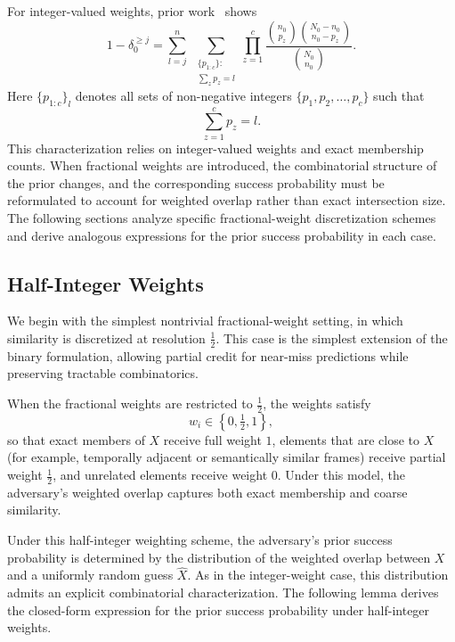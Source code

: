 \documentclass[letterpaper]{article} %
\begin{document}
For integer-valued weights, prior work~\cite{xiao2024formal} shows
\begin{equation}
    1 - \delta_{0}^{\ge j}
=
\sum_{l=j}^{n}\;
\sum_{\substack{\{p_{1:c}\}:\\ \sum_z p_z = l}}
\prod_{z=1}^c
\frac{\binom{n_0}{p_z}
\binom{N_0 - n_0}{n_0 - p_z}}
{\binom{N_0}{n_0}}.
\end{equation}
Here $\{p_{1:c}\}_l$ denotes all sets of non-negative integers $\{p_1, p_2, \ldots, p_c\}$ such that
\[
\sum_{z=1}^c p_z = l.
\]
This characterization relies on integer-valued weights and exact membership counts. When fractional weights are introduced, the combinatorial structure of the prior changes, and the corresponding success probability must be reformulated to account for weighted overlap rather than exact intersection size. The following sections analyze specific fractional-weight discretization schemes and derive analogous expressions for the prior success probability in each case.


\subsection{Half-Integer Weights}

We begin with the simplest nontrivial fractional-weight setting, in which similarity is discretized at resolution $\tfrac12$. This case is the simplest extension of the binary formulation, allowing partial credit for near-miss predictions while preserving tractable combinatorics.

When the fractional weights are restricted to $\tfrac12$, the weights satisfy
\[
w_i \in \left\{0, \tfrac12, 1 \right\},
\]
so that exact members of $X$ receive full weight $1$, elements that are close to $X$ (for example, temporally adjacent or semantically similar frames) receive partial weight $\tfrac12$, and unrelated elements receive weight $0$. Under this model, the adversary's weighted overlap captures both exact membership and coarse similarity.

Under this half-integer weighting scheme, the adversary's prior success probability is determined by the distribution of the weighted overlap between $X$ and a uniformly random guess $\widehat{X}$. As in the integer-weight case, this distribution admits an explicit combinatorial characterization. The following lemma derives the closed-form expression for the prior success probability under half-integer weights.
\end{document}
